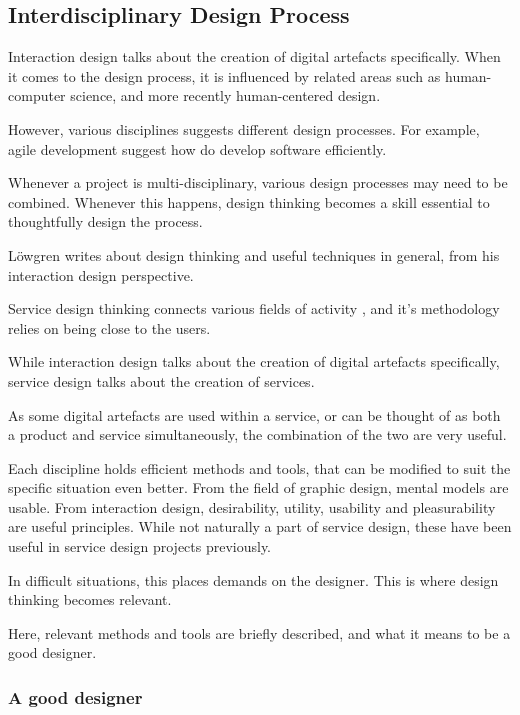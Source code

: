 \subsection{Interdisciplinary Design Process}

%

Interaction design talks about the creation of digital artefacts specifically. When it comes to the design process, it is influenced by related areas such as human-computer science, and more recently human-centered design.

However, various disciplines suggests different design processes. For example, agile development suggest how do develop software efficiently.

Whenever a project is multi-disciplinary, various design processes may need to be combined. Whenever this happens, design thinking becomes a skill essential to thoughtfully design the process.

Löwgren \cite{lowgren} writes about design thinking and useful techniques in general, from his interaction design perspective.

Service design thinking connects various fields of activity \cite{stickdorn}, and it's methodology relies on being close to the users.

While interaction design talks about the creation of digital artefacts specifically, service design talks about the creation of services.

As some digital artefacts are used within a service, or can be thought of as both a product and service simultaneously, the combination of the two are very useful.

Each discipline holds efficient methods and tools, that can be modified to suit the specific situation even better. From the field of graphic design, mental models are usable. From interaction design, desirability, utility, usability and pleasurability are useful principles. While not naturally a part of service design, these have been useful in service design projects previously. \cite{stickdorn}

In difficult situations, this places demands on the designer. This is where design thinking becomes relevant.

Here, relevant methods and tools are briefly described, and what it means to be a good designer.

\subsubsection{A good designer}

